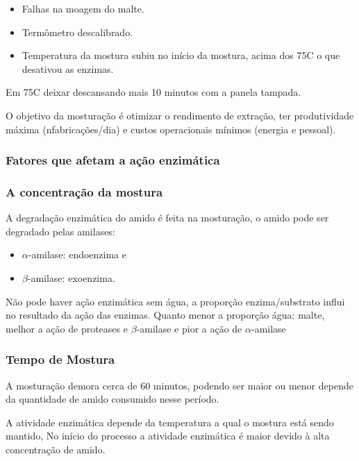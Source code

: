 \begin{itemize}
    \item Falhas na moagem do malte.
    \item Termômetro descalibrado.
    \item Temperatura da mostura subiu no início da mostura, acima dos 75\textdegree C o que desativou as enzimas.
\end{itemize}

Em 75\textdegree C deixar descansando mais 10 minutos com a panela tampada.

O objetivo da mosturação é otimizar o rendimento de extração, ter produtividade máxima (n\textdegree  fabricações/dia) e custos operacionais mínimos (energia e pessoal).

\subsubsection{Fatores que afetam a ação enzimática}

\subsubsection{A concentração da mostura}

A degradação enzimática do amido é feita na mosturação, o amido pode ser degradado pelas amilases:

\begin{itemize}
    \item \(\alpha\)-amilase: endoenzima e
    \item \(\beta\)-amilase: exoenzima.
\end{itemize}

Não pode haver ação enzimática sem água, a proporção enzima/substrato influi no resultado da ação das enzimas. Quanto menor a proporção água: malte, melhor a ação de proteases e \(\beta\)-amilase e pior a ação de \(\alpha\)-amilase

\subsubsection{Tempo de Mostura}

A mosturação demora cerca de 60 minutos, podendo ser maior ou menor depende da quantidade de amido consumido nesse período.

A atividade enzimática depende da temperatura a qual o mostura está sendo mantido, No início do processo a atividade enzimática é maior devido à alta concentração de amido.

